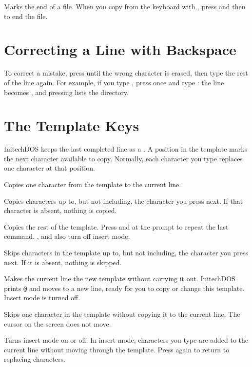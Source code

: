 
Marks the end of a file. When you copy from the keyboard
with , press  and then  to end the
file.

\section{Correcting a Line with Backspace}
To correct a mistake, press  until the wrong character is
erased, then type the rest of the line again. For example, if you type
, press  once and type : the line becomes
, and pressing  lists the directory.

\section{The Template Keys}
InitechDOS keeps the last completed line as a . A position
in the template marks the next character available to copy. Normally, each
character you type replaces one character at that position.

Copies one character from the template to the current line.

Copies characters up to, but not including, the character you
press next. If that character is absent, nothing is copied.

Copies the rest of the template. Press  and
 at the prompt to repeat the last command. , 
and  also turn off insert mode.

Skips characters in the template up to, but not including,
the character you press next. If it is absent, nothing is skipped.

Makes the current line the new template without carrying it
out. InitechDOS prints \texttt{@} and moves to a new line, ready for you to
copy or change this template. Insert mode is turned off.

Skips one character in the template without copying it to
the current line. The cursor on the screen does not move.

Turns insert mode on or off. In insert mode, characters you
type are added to the current line without moving through the template.
Press  again to return to replacing characters.

